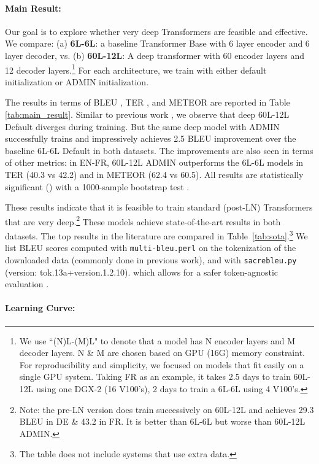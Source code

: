 \documentclass[11pt,a4paper]{article}
\begin{document}
\paragraph{Main Result:}
Our goal is to explore whether very deep Transformers are feasible and effective. 
We compare: (a) \textbf{6L-6L}: a baseline Transformer Base with 6 layer encoder and 6 layer decoder, vs. (b) \textbf{60L-12L}: A deep transformer with 60 encoder layers and 12 decoder layers.\footnote{We use ``(N)L-(M)L" to denote that a model has N encoder layers and M decoder layers. N \& M are chosen based on GPU (16G) memory constraint. For reproducibility and simplicity, we focused on models that fit easily on a single GPU system. Taking FR as an example, it takes 2.5 days to train 60L-12L using one DGX-2 (16 V100's), 2 days to train a 6L-6L using 4 V100's.}
For each architecture, we train with either default initialization \cite{glorot2010init} or ADMIN initialization.

The results in terms of BLEU \cite{bleu}, TER \cite{snover06}, and METEOR \cite{lavie07meteor} are reported in Table \ref{tab:main_result}. 
Similar to previous work \cite{bapna2018training}, we observe that deep 60L-12L Default diverges during training. 
But the same deep model with ADMIN successfully trains and impressively achieves 2.5 BLEU improvement over the baseline 6L-6L Default in both datasets. 
The improvements are also seen in terms of other metrics: in EN-FR, 60L-12L ADMIN outperforms the 6L-6L models in TER (40.3 vs 42.2) and in METEOR (62.4 vs 60.5). All results are statistically significant () with a 1000-sample bootstrap test \cite{clark2011boost-smt}.

These results indicate that it is feasible to train standard (post-LN) Transformers that are very deep.\footnote{Note: the pre-LN version does train successively on 60L-12L and achieves 29.3 BLEU in DE \& 43.2 in FR. It is better than 6L-6L but worse than 60L-12L ADMIN.}
These models achieve state-of-the-art results in both datasets. The top results in the literature are compared in Table~\ref{tab:sota}.\footnote{The table does not include systems that use extra data.} We list BLEU scores computed with \texttt{multi-bleu.perl} on the tokenization of the downloaded data (commonly done in previous work), and with \texttt{sacrebleu.py} (version: tok.13a+version.1.2.10). which allows for a safer token-agnostic evaluation \cite{post2018sacrebleu}. 


\paragraph{Learning Curve:}
\end{document}
